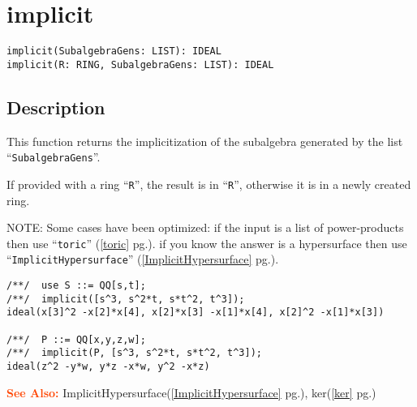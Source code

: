\documentclass[a4paper]{mybook}
\newenvironment{command}{}{} %
\newcommand\SeeAlso{\par\textcolor{OrangeRed}{\textbf{\large See Also: }}}
\begin{document}
\section{implicit}
\label{implicit}
\begin{command} %


\begin{Verbatim}[label=syntax, rulecolor=\color{MidnightBlue},
frame=single]
implicit(SubalgebraGens: LIST): IDEAL
implicit(R: RING, SubalgebraGens: LIST): IDEAL
\end{Verbatim}


\subsection*{Description}

This function returns the implicitization of the subalgebra generated
by the list ``\verb&SubalgebraGens&''.
\par 
If provided with a ring ``\verb&R&'', the result is in ``\verb&R&'',
otherwise it is in a newly created ring.
\par 
NOTE: Some cases have been optimized:
if the input is a list of power-products then use ``\verb&toric&'' (\ref{toric} pg.\pageref{toric}).
if you know the answer is a hypersurface then use ``\verb&ImplicitHypersurface&'' (\ref{ImplicitHypersurface} pg.\pageref{ImplicitHypersurface}).
\begin{Verbatim}[label=example, rulecolor=\color{PineGreen}, frame=single]
/**/  use S ::= QQ[s,t];
/**/  implicit([s^3, s^2*t, s*t^2, t^3]);
ideal(x[3]^2 -x[2]*x[4], x[2]*x[3] -x[1]*x[4], x[2]^2 -x[1]*x[3])

/**/  P ::= QQ[x,y,z,w];
/**/  implicit(P, [s^3, s^2*t, s*t^2, t^3]);
ideal(z^2 -y*w, y*z -x*w, y^2 -x*z)
\end{Verbatim}


\SeeAlso %
  ImplicitHypersurface(\ref{ImplicitHypersurface} pg.\pageref{ImplicitHypersurface}), 
    ker(\ref{ker} pg.\pageref{ker})
\end{command} %
\end{document}
